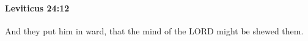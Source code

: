 
		\paragraph{Leviticus 24:12} %
			\label{LEVITICUS-24-12}

			And they put him in ward, that the mind of the LORD might be shewed them.


